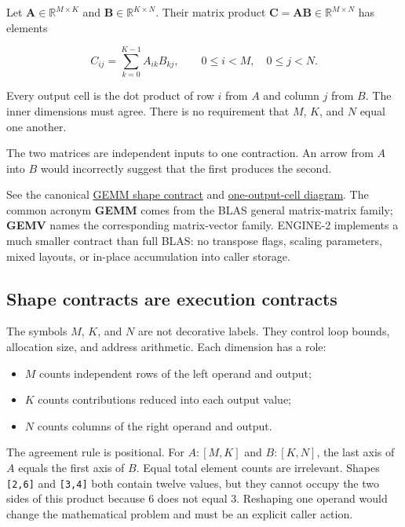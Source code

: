 \documentclass[
  10pt,
]{article}
\providecommand{\tightlist}{%
  \setlength{\itemsep}{0pt}\setlength{\parskip}{0pt}}
\begin{document}
Let \(\mathbf{A}\in\mathbb{R}^{M\times K}\) and
\(\mathbf{B}\in\mathbb{R}^{K\times N}\). Their matrix product
\(\mathbf{C}=\mathbf{A}\mathbf{B}\in\mathbb{R}^{M\times N}\) has
elements

\[
C_{ij}=\sum_{k=0}^{K-1}A_{ik}B_{kj},
\qquad 0\le i<M,\quad 0\le j<N.
\]

Every output cell is the dot product of row \(i\) from \(A\) and column
\(j\) from \(B\). The inner dimensions must agree. There is no
requirement that \(M\), \(K\), and \(N\) equal one another.

The two matrices are independent inputs to one contraction. An arrow
from \(A\) into \(B\) would incorrectly suggest that the first produces
the second.

See the canonical
\href{https://github.com/hermonai/inside-the-llm-engine/blob/astra-visual-rewrite/diagrams/linear/gemm-shape-contract.txt}{GEMM
shape contract} and
\href{https://github.com/hermonai/inside-the-llm-engine/blob/astra-visual-rewrite/diagrams/linear/gemm-one-output-cell.txt}{one-output-cell
diagram}. The common acronym \textbf{GEMM} comes from the BLAS general
matrix-matrix family; \textbf{GEMV} names the corresponding
matrix-vector family. ENGINE-2 implements a much smaller contract than
full BLAS: no transpose flags, scaling parameters, mixed layouts, or
in-place accumulation into caller storage.

\subsection{Shape contracts are execution
contracts}\label{shape-contracts-are-execution-contracts}

The symbols \(M\), \(K\), and \(N\) are not decorative labels. They
control loop bounds, allocation size, and address arithmetic. Each
dimension has a role:

\begin{itemize}
\tightlist
\item
  \(M\) counts independent rows of the left operand and output;
\item
  \(K\) counts contributions reduced into each output value;
\item
  \(N\) counts columns of the right operand and output.
\end{itemize}

The agreement rule is positional. For \(A:[M,K]\) and \(B:[K,N]\), the
last axis of \(A\) equals the first axis of \(B\). Equal total element
counts are irrelevant. Shapes \texttt{{[}2,6{]}} and \texttt{{[}3,4{]}}
both contain twelve values, but they cannot occupy the two sides of this
product because 6 does not equal 3. Reshaping one operand would change
the mathematical problem and must be an explicit caller action.
\end{document}
